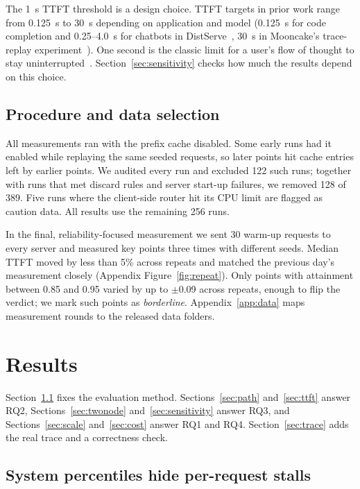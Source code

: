 \documentclass[11pt]{article}
\begin{document}
The 1~s TTFT threshold is a design choice. TTFT targets in prior work range from 0.125~s to 30~s depending on application and model (0.125~s for code completion and 0.25--4.0~s for chatbots in DistServe~\cite{distserve}, 30~s in Mooncake's trace-replay experiment~\cite{mooncake}). One second is the classic limit for a user's flow of thought to stay uninterrupted~\cite{nielsen}. Section~\ref{sec:sensitivity} checks how much the results depend on this choice.

\subsection{Procedure and data selection}\label{sec:procedure}
All measurements ran with the prefix cache disabled. Some early runs had it enabled while replaying the same seeded requests, so later points hit cache entries left by earlier points. We audited every run and excluded 122 such runs; together with runs that met discard rules and server start-up failures, we removed 128 of 389. Five runs where the client-side router hit its CPU limit are flagged as caution data. All results use the remaining 256 runs.

In the final, reliability-focused measurement we sent 30 warm-up requests to every server and measured key points three times with different seeds. Median TTFT moved by less than 5\% across repeats and matched the previous day's measurement closely (Appendix Figure~\ref{fig:repeat}). Only points with attainment between 0.85 and 0.95 varied by up to $\pm$0.09 across repeats, enough to flip the verdict; we mark such points as \emph{borderline}. Appendix~\ref{app:data} maps measurement rounds to the released data folders.

\section{Results}

Section~\ref{sec:stalls} fixes the evaluation method. Sections~\ref{sec:path} and~\ref{sec:ttft} answer RQ2, Sections~\ref{sec:twonode} and~\ref{sec:sensitivity} answer RQ3, and Sections~\ref{sec:scale} and~\ref{sec:cost} answer RQ1 and RQ4. Section~\ref{sec:trace} adds the real trace and a correctness check.

\subsection{System percentiles hide per-request stalls}\label{sec:stalls}
\end{document}
